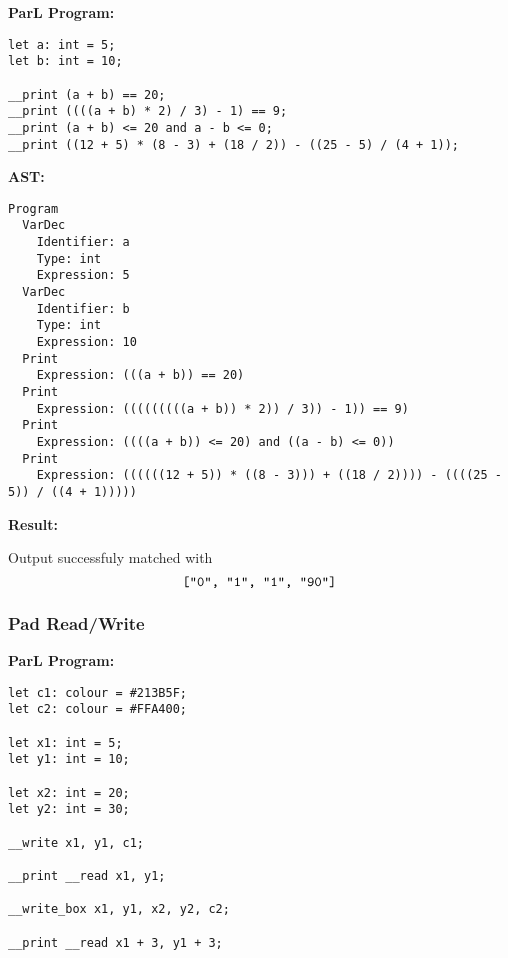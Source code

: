 \textbf{ParL Program:}

{
  \lstset{xleftmargin=0.1\textwidth}

  \begin{lstlisting}
let a: int = 5;
let b: int = 10;

__print (a + b) == 20;
__print ((((a + b) * 2) / 3) - 1) == 9;
__print (a + b) <= 20 and a - b <= 0;
__print ((12 + 5) * (8 - 3) + (18 / 2)) - ((25 - 5) / (4 + 1));
\end{lstlisting}

}

\textbf{AST:}

{

  \lstset{xleftmargin=0\textwidth}

  \begin{lstlisting}
Program
  VarDec
    Identifier: a
    Type: int
    Expression: 5
  VarDec
    Identifier: b
    Type: int
    Expression: 10
  Print
    Expression: (((a + b)) == 20)
  Print
    Expression: (((((((((a + b)) * 2)) / 3)) - 1)) == 9)
  Print
    Expression: ((((a + b)) <= 20) and ((a - b) <= 0))
  Print
    Expression: ((((((12 + 5)) * ((8 - 3))) + ((18 / 2)))) - ((((25 - 5)) / ((4 + 1)))))
\end{lstlisting}

}

\textbf{Result:}

Output successfuly matched with $$\texttt{["0", "1", "1", "90"]}$$

\newpage

\subsubsection*{Pad Read/Write}

\textbf{ParL Program:}

{
  \lstset{xleftmargin=0.2\textwidth}

  \begin{lstlisting}
let c1: colour = #213B5F;
let c2: colour = #FFA400;

let x1: int = 5;
let y1: int = 10;

let x2: int = 20;
let y2: int = 30;

__write x1, y1, c1;

__print __read x1, y1;

__write_box x1, y1, x2, y2, c2;

__print __read x1 + 3, y1 + 3;
\end{lstlisting}

}


